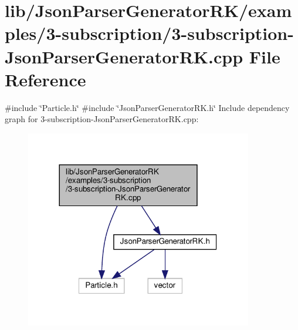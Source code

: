 \hypertarget{3-subscription-_json_parser_generator_r_k_8cpp}{}\section{lib/\+Json\+Parser\+Generator\+R\+K/examples/3-\/subscription/3-\/subscription-\/\+Json\+Parser\+Generator\+RK.cpp File Reference}
\label{3-subscription-_json_parser_generator_r_k_8cpp}
{\ttfamily \#include \char`\"{}Particle.\+h\char`\"{}}\newline
{\ttfamily \#include \char`\"{}Json\+Parser\+Generator\+R\+K.\+h\char`\"{}}\newline
Include dependency graph for 3-\/subscription-\/\+Json\+Parser\+Generator\+RK.cpp\+:
\nopagebreak
\begin{figure}[H]
\begin{center}
\leavevmode
\includegraphics[width=281pt]{3-subscription-_json_parser_generator_r_k_8cpp__incl}
\end{center}
\end{figure}
